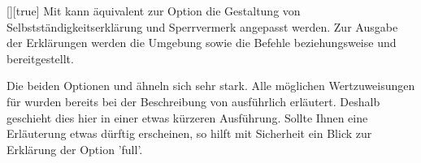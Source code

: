 \begin{Declaration}{[\PSet]}[true]%
\printdeclarationlist%
%
%
Mit  kann äquivalent zur Option  die 
Gestaltung von Selbstständigkeitserklärung und Sperrvermerk angepasst werden.
Zur Ausgabe der Erklärungen werden die Umgebung  
sowie die Befehle  beziehungsweise  und 
 bereitgestellt. 

Die beiden Optionen  und  ähneln sich sehr 
stark. Alle möglichen Wertzuweisungen für  wurden bereits 
bei der Beschreibung von  ausführlich erläutert. Deshalb 
geschieht dies hier in einer etwas kürzeren Ausführung. Sollte Ihnen eine 
Erläuterung etwas dürftig erscheinen, so hilft mit Sicherheit ein Blick zur 
Erklärung der Option 'full'.


\end{Declaration}
